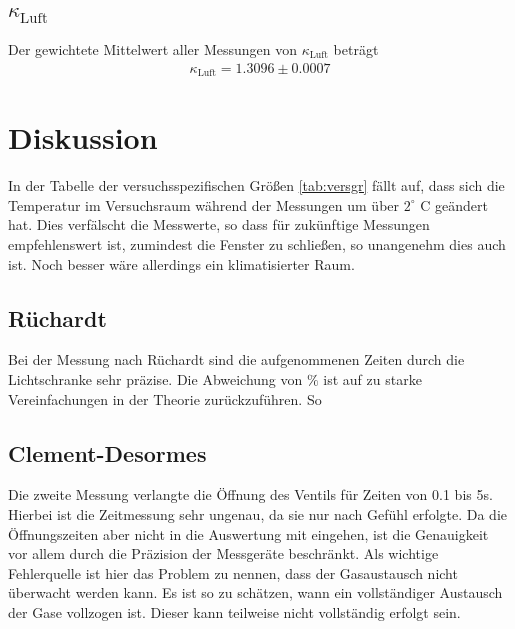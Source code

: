 \documentclass[12pt,a4paper,titlepage,headinclude,bibtotoc]{scrartcl}
\begin{document}
\subsection{$\kappa_\text{Luft}$}
Der gewichtete Mittelwert aller Messungen von $\kappa_\text{Luft}$ beträgt
\begin{align*}
	\kappa_\text{Luft}=1.3096\pm 0.0007
\end{align*}

\section{Diskussion}
\label{sec:diskussion}
In der Tabelle der versuchsspezifischen Größen \ref{tab:versgr} fällt auf, dass sich die Temperatur im Versuchsraum während der Messungen um über $2^\circ$ C geändert hat.
Dies verfälscht die Messwerte, so dass für zukünftige Messungen empfehlenswert ist, zumindest die Fenster zu schließen, so unangenehm dies auch ist.
Noch besser wäre allerdings ein klimatisierter Raum.\\

\subsection{Rüchardt}
Bei der Messung nach Rüchardt sind die aufgenommenen Zeiten durch die Lichtschranke sehr präzise.
Die Abweichung von $%
\%$ ist auf zu starke Vereinfachungen in der Theorie zurückzuführen.
So 


\subsection{Clement-Desormes}
Die zweite Messung verlangte die Öffnung des Ventils für Zeiten von 0.1 bis 5s.
Hierbei ist die Zeitmessung sehr ungenau, da sie nur nach Gefühl erfolgte.
Da die Öffnungszeiten aber nicht in die Auswertung mit eingehen, ist die Genauigkeit vor allem durch die Präzision der Messgeräte beschränkt.
Als wichtige Fehlerquelle ist hier das Problem zu nennen, dass der Gasaustausch nicht überwacht werden kann.
Es ist so zu schätzen, wann ein vollständiger Austausch der Gase vollzogen ist.
Dieser kann teilweise nicht vollständig erfolgt sein.\\






\end{document}

